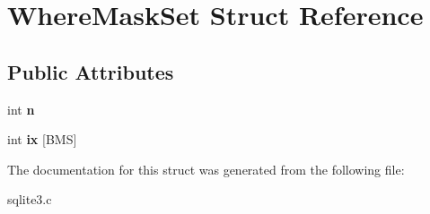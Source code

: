 \hypertarget{struct_where_mask_set}{\section{Where\-Mask\-Set Struct Reference}
\label{struct_where_mask_set}
}
\subsection*{Public Attributes}
\begin{DoxyCompactItemize}
\item 
\hypertarget{struct_where_mask_set_a09923e1dee2157c78c5ae0df65e8ee7c}{int {\bfseries n}}\label{struct_where_mask_set_a09923e1dee2157c78c5ae0df65e8ee7c}

\item 
\hypertarget{struct_where_mask_set_a9de4e7b27d4f793f37c1ead7b44ecb48}{int {\bfseries ix} \mbox{[}B\-M\-S\mbox{]}}\label{struct_where_mask_set_a9de4e7b27d4f793f37c1ead7b44ecb48}

\end{DoxyCompactItemize}


The documentation for this struct was generated from the following file\-:\begin{DoxyCompactItemize}
\item 
sqlite3.\-c\end{DoxyCompactItemize}
